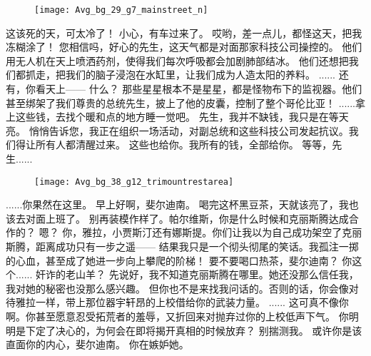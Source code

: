 \documentclass[openany]{book}
\begin{document}
\begin{figure}[h]
    \centering
    \texttt{[image: Avg\_bg\_29\_g7\_mainstreet\_n]}
\end{figure}
\begin{dialogue}
     这该死的天，可太冷了！
     小心，有车过来了。
     哎哟，差一点儿，都怪这天，把我冻糊涂了！
     您相信吗，好心的先生，这天气都是对面那家科技公司操控的。
     他们用无人机在天上喷洒药剂，使得我们每次呼吸都会加剧肺部结冰。
     他们还想把我们都抓走，把我们的脑子浸泡在水缸里，让我们成为人造太阳的养料。
     ......
     还有，你看天上——
     什么？
     那些星星根本不是星星，都是怪物布下的监视器。他们甚至绑架了我们尊贵的总统先生，披上了他的皮囊，控制了整个哥伦比亚！
     ......拿上这些钱，去找个暖和点的地方睡一觉吧。
     先生，我并不缺钱，我只是在等天亮。
     悄悄告诉您，我正在组织一场活动，对副总统和这些科技公司发起抗议。我们得让所有人都清醒过来。
     这些也给你。我所有的钱，全部给你。
     等等，先生......
    \begin{figure}[h]
        \centering
        \texttt{[image: Avg\_bg\_38\_g12\_trimountrestarea]}
    \end{figure}
     ......你果然在这里。
     早上好啊，斐尔迪南。
     喝完这杯黑豆茶，天就该亮了，我也该去对面上班了。
     别再装模作样了。帕尔维斯，你是什么时候和克丽斯腾达成合作的？
     嗯？
     你，雅拉，小贾斯汀还有娜斯提。你们让我以为自己成功架空了克丽斯腾，距离成功只有一步之遥——
     结果我只是一个彻头彻尾的笑话。我孤注一掷的心血，甚至成了她进一步向上攀爬的阶梯！
     要不要喝口热茶，斐尔迪南？
     你这个......
     奸诈的老山羊？
     先说好，我不知道克丽斯腾在哪里。她还没那么信任我，我对她的秘密也没那么感兴趣。
     但你也不是来找我问话的。否则的话，你会像对待雅拉一样，带上那位器宇轩昂的上校借给你的武装力量。
     ......
     这可真不像你啊。你甚至愿意忍受拓荒者的羞辱，又折回来对抛弃过你的上校低声下气。
     你明明是下定了决心的，为何会在即将揭开真相的时候放弃？
     别揣测我。
     或许你是该直面你的内心，斐尔迪南。
     你在嫉妒她。

\end{dialogue}
\end{document}
